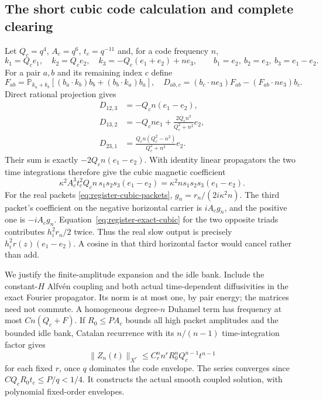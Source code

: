 \documentclass[11pt,a4paper]{amsart}
\theoremstyle{definition}
\theoremstyle{remark}
\numberwithin{equation}{section}
\newcommand{\PP}{\mathbb P}
\newcommand{\norm}[1]{\lVert #1\rVert}
\begin{document}
\subsection{The short cubic code calculation and complete clearing}
Let $Q_c=q^4$, $A_c=q^6$, $t_c=q^{-11}$ and, for a code frequency $n$,
\[
 k_1=Q_ce_1,\quad k_2=Q_ce_2,\quad
 k_3=-Q_c(e_1+e_2)+ne_3,\qquad
 b_1=e_2,\ b_2=e_3,\ b_3=e_1-e_2.
\]
For a pair $a,b$ and its remaining index $c$ define
\[
 F_{ab}=\PP_{k_a+k_b}
       [(b_a\cdot k_b)b_b+(b_b\cdot k_a)b_a],\quad
 D_{ab,c}=(b_c\cdot ne_3)F_{ab}-(F_{ab}\cdot ne_3)b_c.
\]
Direct rational projection gives
\begin{align*}
 D_{12,3}&=-Q_cn(e_1-e_2),\\
 D_{13,2}&=-Q_cn e_1+
               \frac{2Q_cn^3}{Q_c^2+n^2}e_2,\\
 D_{23,1}&=\frac{Q_cn(Q_c^2-n^2)}{Q_c^2+n^2}e_2.
\end{align*}
Their sum is exactly $-2Q_cn(e_1-e_2)$.  With identity linear
propagators the two time integrations therefore give the cubic magnetic
coefficient
\begin{equation}\label{eq:register-exact-cubic}
 \kappa^2 A_c^3t_c^2Q_cn\,s_1s_2s_3(e_1-e_2)
       =\kappa^2n s_1s_2s_3(e_1-e_2).
\end{equation}
For the real packets \eqref{eq:register-cubic-packets},
$g_n=r_n/(2i\kappa^2n)$.  The third packet's coefficient on the negative
horizontal carrier is $iA_cg_n$, and the positive one is $-iA_cg_n$.
Equation~\eqref{eq:register-exact-cubic} for the two opposite triads
contributes $h_i^2r_n/2$ twice.  Thus the real slow output is precisely
$h_i^2r(z)(e_1-e_2)$.  A cosine in that third horizontal factor would
cancel rather than add.

We justify the finite-amplitude expansion and the idle bank.  Include the
constant-$H$ Alfv\'en coupling and both actual time-dependent diffusivities
in the exact Fourier propagator.  Its norm is at most one, by pair energy;
the matrices need not commute.  A homogeneous degree-$n$ Duhamel term has
frequency at most $Cn(Q_c+F)$.  If $R_0\le PA_c$ bounds all high packet
amplitudes and the bounded idle bank, Catalan recurrence with its
$n/(n-1)$ time-integration factor gives
\begin{equation}\label{eq:register-triad-majorant}
 \norm{Z_n(t)}_{X^r}
 \le C_r^n n^rR_0^nQ_c^{n-1}t^{n-1}
\end{equation}
for each fixed $r$, once $q$ dominates the code envelope.  The series
converges since $CQ_cR_0t_c\le P/q<1/4$.  It constructs the actual
smooth coupled solution, with polynomial fixed-order envelopes.
\end{document}
